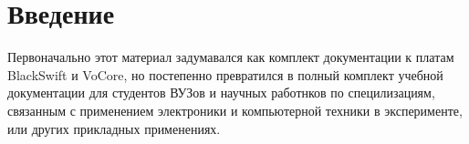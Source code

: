 \section*{Введение}

Первоначально этот материал задумавался как комплект документации
к платам BlackSwift и VoCore, но постепенно превратился в полный
комплект учебной документации для студентов ВУЗов и научных работнков
по специлизациям, связанным с применением электроники и компьютерной техники в
эксперименте, или других прикладных применениях.
